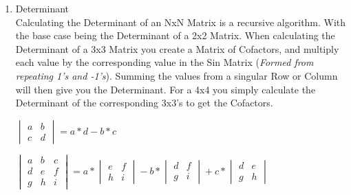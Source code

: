 \begin{flushleft}
\begin{enumerate}
                    \item Determinant \\
                        Calculating the Determinant of an NxN Matrix is a recursive algorithm. With the base case being the Determinant of a 2x2
                        Matrix. When calculating the Determinant of a 3x3 Matrix you create a Matrix of Cofactors, and multiply each 
                        value by the corresponding value in the Sin Matrix (\textit{Formed from repeating 1's and -1's}). Summing the values from
                        a singular Row or Column will then give you the Determinant. For a 4x4 you simply calculate the Determinant of the corresponding
                        3x3's to get the Cofactors.
                        
                        \begin{center}
                            $
                            \begin{vmatrix}
                                a & b\\
                                c & d
                            \end{vmatrix} = 
                                a*d - b*c
                            $
                        \end{center}
                        \vspace{0.25cm}
                        \begin{center}
                            $\begin{vmatrix}
                                a & b & c \\
                                d & e & f \\
                                g & h & i 
                            \end{vmatrix}  = a*
                            \begin{vmatrix}
                                e & f\\
                                h & i
                            \end{vmatrix}
                            -b*
                            \begin{vmatrix}
                                d & f\\
                                g & i
                            \end{vmatrix}
                            +c*
                            \begin{vmatrix}
                                d & e\\
                                g & h
                            \end{vmatrix}$
                        \end{center}
                        \vspace{0.25cm}


\end{enumerate}
\end{flushleft}

